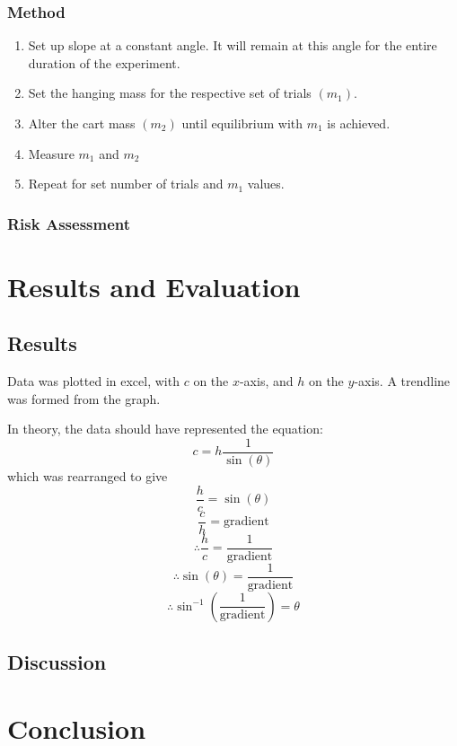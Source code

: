 \documentclass[12pt,a4paper]{article}
\begin{document}
\subsubsection{Method}
\begin{enumerate}
\item Set up slope at a constant angle. It will remain at this angle for the entire duration of the experiment. 
\item Set the hanging mass for the respective set of trials $(m_1)$. 
\item Alter the cart mass $(m_2)$ until equilibrium with $m_1$ is achieved.
\item Measure $m_1$ and $m_2$ 
\item Repeat for set number of trials and $m_1$ values.
	
	 
\end{enumerate}


\subsubsection{Risk Assessment}

\section{Results and Evaluation}
\subsection{Results}


Data was plotted in excel, with $c$ on the $x$-axis, and  $h$ on the $y$-axis. A trendline was formed from the graph. 

In theory, the data should have represented the equation:
$$c=h\frac{1}{\sin(\theta)}$$
which was rearranged to give 
$$\frac{h}{c}=\sin{(\theta)}$$
$$\frac{c}{h}=\mathrm{gradient}$$
$$\therefore \frac{h}{c}=\frac{1}{\mathrm{gradient}}$$
$$\therefore \sin(\theta)=\frac{1}{\textrm{gradient}}$$
$$\therefore \sin^{-1}\left(\frac{1}{
\textrm{gradient}}\right)=\theta$$
\subsection{Discussion}


\section{Conclusion}

	
	
	
\end{document}
